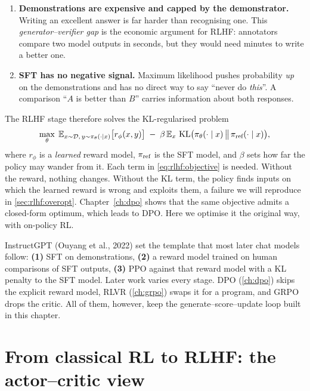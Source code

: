 \begin{enumerate}
  \item \textbf{Demonstrations are expensive and capped by the demonstrator.} Writing an excellent
        answer is far harder than recognising one. This \emph{generator--verifier gap} is the
        economic argument for RLHF: annotators compare two model outputs in seconds, but they
        would need minutes to write a better one.
  \item \textbf{SFT has no negative signal.} Maximum likelihood pushes probability \emph{up} on the
        demonstrations and has no direct way to say ``never do \emph{this}''. A comparison
        ``$A$ is better than $B$'' carries information about both responses.
\end{enumerate}

The RLHF stage therefore solves the KL-regularised problem
\begin{equation}
  \max_{\theta}\; \mathbb{E}_{x\sim\mathcal{D},\,y\sim\pi_\theta(\cdot\mid x)}
  \big[r_\phi(x,y)\big] \;-\; \beta\,\mathbb{E}_{x}\,
  \operatorname{KL}\!\big(\pi_\theta(\cdot\mid x)\,\big\|\,\pi_{\text{ref}}(\cdot\mid x)\big),
  \label{eq:rlhf:objective}
\end{equation}
where $r_\phi$ is a \emph{learned} reward model, $\pi_{\text{ref}}$ is the SFT model, and $\beta$ sets
how far the policy may wander from it. Each term in \cref{eq:rlhf:objective} is needed. Without
the reward, nothing changes. Without the KL term, the policy finds inputs on which the learned
reward is wrong and exploits them, a failure we will reproduce in \cref{sec:rlhf:overopt}.
Chapter~\ref{ch:dpo} shows that the same objective admits a closed-form optimum, which leads to
DPO. Here we optimise it the original way, with on-policy RL.

\begin{keyidea}
InstructGPT (Ouyang et al., 2022) set the template that most later chat models follow: \textbf{(1)}
SFT on demonstrations, \textbf{(2)} a reward model trained on human comparisons of SFT outputs,
\textbf{(3)} PPO against that reward model with a KL penalty to the SFT model. Later work varies
every stage. DPO (\cref{ch:dpo}) skips the explicit reward model, RLVR (\cref{ch:grpo}) swaps it
for a program, and GRPO drops the critic. All of them, however, keep the
generate--score--update loop built in this chapter.
\end{keyidea}

\section{From classical RL to RLHF: the actor--critic view}\label{sec:rlhf:actorcritic}


